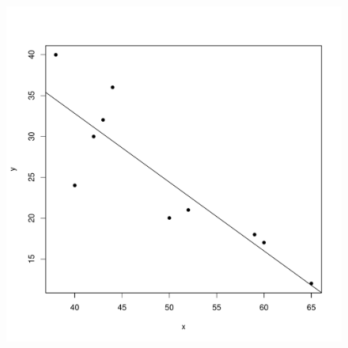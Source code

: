 \begin{solution}{2.1}
\begin{enumerate}
\begin{figure}
\begin{knitrout}
\begin{kframe}
\begin{alltt}
\end{alltt}
\end{kframe}
\end{knitrout}
\begin{knitrout}
\color{fgcolor}
\includegraphics[width=\maxwidth]{figure/unnamed-chunk-11-1}


\end{knitrout}
\end{figure}
\end{enumerate}
\end{solution}
